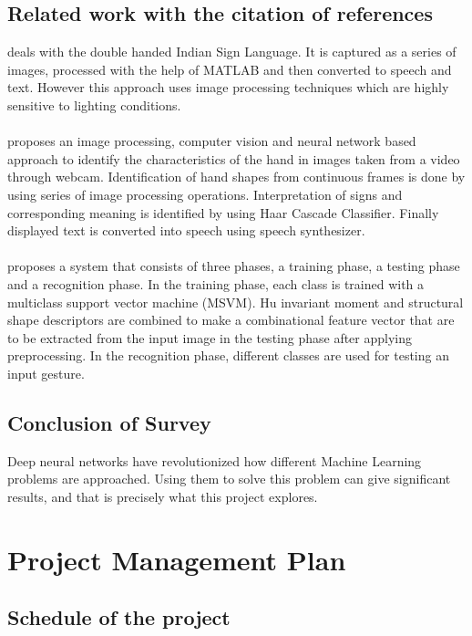 \documentclass[12pt,oneside,a4paper]{article}
\newcommand\todo[1]{\textcolor{blue}{#1}}
\newcommand\placeholder[1]{\todo{\lipsum[#1]}}
\begin{document}
		\subsection{Related work with the citation of references}
			\cite{dutta:2015} deals with the double handed Indian Sign Language. It is captured as a series of images, processed with the help of MATLAB and then converted to speech and text. However this approach uses image processing techniques which are highly sensitive to lighting conditions. \\
			\\
			\cite{DK:2014} proposes an image processing, computer vision and neural network based approach to identify the characteristics of the hand in images taken from a video through webcam. Identification of hand shapes from continuous frames is done by using series of image processing operations. Interpretation of signs and corresponding meaning is identified by using Haar Cascade Classifier. Finally displayed text is converted into speech using speech synthesizer. \\
			\\
			\cite{autoisl:2013} proposes a system that consists of three phases, a training phase, a testing phase and a recognition phase. In the training phase, each class is trained with a multiclass support vector machine (MSVM). Hu invariant moment and structural shape descriptors are combined to make a combinational feature vector that are to be extracted from the input image in the testing phase after applying preprocessing. In the recognition phase, different classes are used for testing an input gesture.

		\subsection{Conclusion of Survey}
			Deep neural networks have revolutionized how different Machine Learning problems are approached. Using them to solve this problem can give significant results, and that is precisely what this project explores.

	\section{Project Management Plan}

		\subsection{Schedule of the project}
			\placeholder{2}
\end{document}
